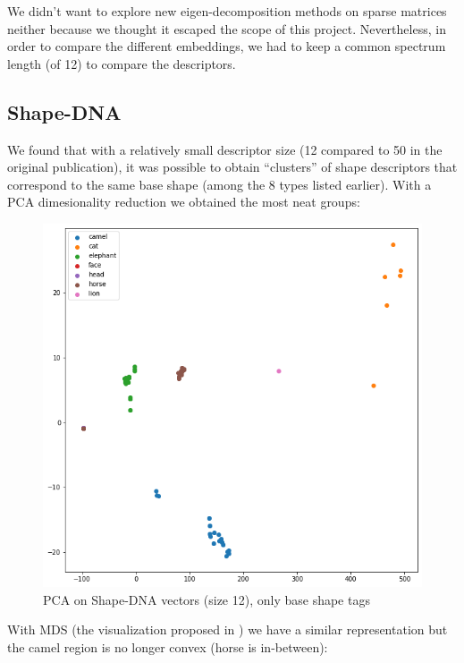 \documentclass[conference]{IEEEtran}
\newcommand{\q}[1]{``#1''} %
\begin{document}
We didn't want to explore new eigen-decomposition methods on sparse matrices neither because we thought it escaped the scope of this project. Nevertheless, in order to compare the different embeddings, we had to keep a common spectrum length (of 12) to compare the descriptors.

\subsection{Shape-DNA}

We found that with a relatively small descriptor size (12 compared to 50 in the original publication), it was possible to obtain \q{clusters} of shape descriptors that correspond to the same base shape (among the 8 types listed earlier). With a PCA dimesionality reduction we obtained the most neat groups:

\begin{figure}[H]
    \centering
    \includegraphics[width=0.9\columnwidth]{pca_simple.png}
    \caption{PCA on Shape-DNA vectors (size 12), only base shape tags}
    \label{fig:pca_simple}
\end{figure}

With MDS (the visualization proposed in \cite{Reuter06}) we have a similar representation but the \textsf{camel} region is no longer convex (\textsf{horse} is in-between):
\end{document}
